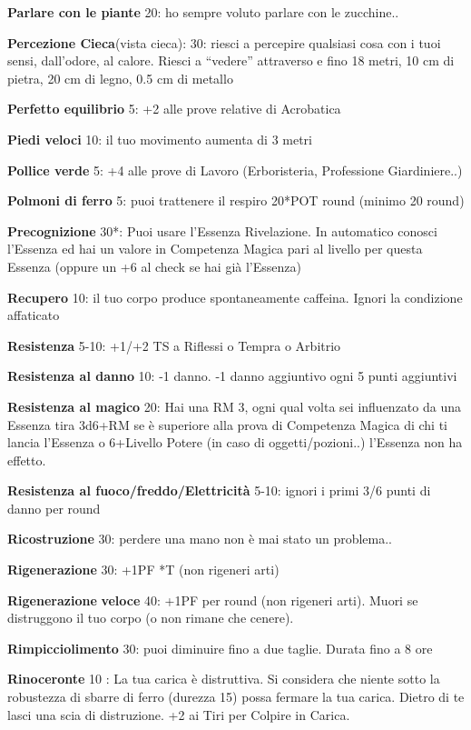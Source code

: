 \documentclass[a4paper,11pt,twoside,openany]{book}
\begin{document}
\textbf{Parlare con le piante} 20: ho sempre voluto parlare con le zucchine..

\textbf{Percezione Cieca}(vista cieca): 30: riesci a percepire qualsiasi cosa con i tuoi sensi, dall’odore, al calore. Riesci a “vedere” attraverso e fino 18 metri, 10 cm di pietra, 20 cm di legno, 0.5 cm di metallo

\textbf{Perfetto equilibrio} 5: +2 alle prove relative di Acrobatica

\textbf{Piedi veloci} 10: il tuo movimento aumenta di 3 metri

\textbf{Pollice verde} 5: +4 alle prove di Lavoro (Erboristeria, Professione Giardiniere..)

\textbf{Polmoni di ferro} 5: puoi trattenere il respiro 20*POT round (minimo 20 round)

\textbf{Precognizione} 30{*}: Puoi usare l'Essenza Rivelazione. In automatico conosci l'Essenza ed hai un valore in Competenza Magica pari al livello per questa Essenza (oppure un +6 al check se hai già l'Essenza)

\textbf{Recupero} 10: il tuo corpo produce spontaneamente caffeina.  Ignori la condizione affaticato

\textbf{Resistenza} 5-10: +1/+2 TS a Riflessi o Tempra o Arbitrio

\textbf{Resistenza al danno} 10: -1 danno. -1 danno aggiuntivo ogni 5 punti aggiuntivi

\textbf{Resistenza al magico} 20: Hai una RM 3, ogni qual volta sei influenzato da una Essenza tira 3d6+RM se è superiore alla prova di Competenza Magica di chi ti lancia l'Essenza o 6+Livello Potere (in caso di oggetti/pozioni..) l'Essenza non ha effetto.

\textbf{Resistenza al fuoco/freddo/Elettricità} 5-10: ignori i primi 3/6 punti di danno per round

\textbf{Ricostruzione} 30: perdere una mano non è mai stato un problema..

\textbf{Rigenerazione} 30: +1PF {*}T (non rigeneri arti)

\textbf{Rigenerazione} \textbf{veloce} 40: +1PF per round (non rigeneri arti). Muori se distruggono il tuo corpo (o non rimane che cenere).

\textbf{Rimpicciolimento} 30: puoi diminuire fino a due taglie. Durata fino a 8 ore

\textbf{Rinoceronte} 10 : La tua carica è distruttiva. Si considera che niente sotto la robustezza di sbarre di ferro (durezza 15) possa fermare la tua carica. Dietro di te lasci una scia di distruzione. +2 ai Tiri per Colpire in Carica.
\end{document}
